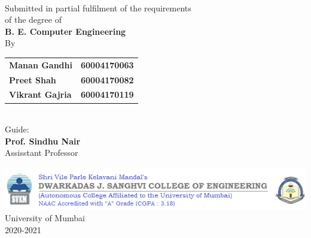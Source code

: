 \begingroup
\makeatletter

\onehalfspacing
\pagestyle{empty}

%

\begin{center}
    {\fontsize{18}{20} \selectfont
    \bf\MakeUppercase \@title}
    \\
    \vspace{24pt}
    Submitted in partial fulfilment of the requirements \\
    of the degree of
    \\
    \vspace{12pt}
    {\fontsize{15}{17} \selectfont
    \bf\large B. E.  Computer Engineering}
    \\
    \vspace{24pt}
    By \\
    \vspace{12pt}
    \fontsize{15}{17} \selectfont
    \begin{tabular}{>{\bfseries}l >{\bfseries}r}
        Manan Gandhi & 60004170063 \\
        Preet Shah & 60004170082 \\
        Vikrant Gajria & 60004170119 \\
    \end{tabular}
    \\
    \vspace{72pt}
    Guide: \\
    {\bf Prof. Sindhu Nair} \\
    Assisstant Professor \\
    
    \vfill
    
    \includegraphics[width=\textwidth]{images/letterhead.png}
    \\
    \fontsize{14}{16} \selectfont
    University of Mumbai \\
    2020-2021
\end{center}

%
\pagebreak

\endgroup
\makeatother

